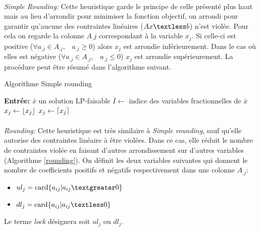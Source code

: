 \documentclass[12pt,a4paper,oneside]{book}
\theoremstyle{definition}
\DeclarePairedDelimiter\ceil{\lceil}{\rceil}
\DeclarePairedDelimiter\floor{\lfloor}{\rfloor}
\begin{document}
	\paragraph{}
	\textit{Simple Rounding:} Cette heuristique garde le principe de celle présenté plus haut mais au lieu d'arrondir pour minimiser la fonction objectif, on arrondi pour garantir qu'aucune des contraintes linéaires ($A x \textless b$) n'est violée. Pour cela on regarde la colonne $A_.j$ correspondant à la variable $x_j$. Si celle-ci est positive ($ \forall a_{.j } \in A_{.j}, \hspace{10pt} a_{.j } \geq 0 $) alors $x_j$ est arrondie inférieurement. Dans le cas où elles est négative ($ \forall a_{.j } \in A_{.j }, \hspace{10pt} a_{.j } \leq 0 $) $x_j$ est arrondie supérieurement. La procédure peut être résumé dans l'algorithme suivant.
	
	\begin{algorithm}
		\caption{Algorithme Simple rounding}
		\SetAlgoLined
		\DontPrintSemicolon
		\textbf{Entrée:} $\bar{x}$ un solution LP-faisable \;
		$\bar{I} \gets $ indice des variables fractionnelles de $\bar{x}$ \;
		{
			{
				$x_j \gets  \floor{x_j}$ \;  
			}
			{
				$x_j \gets  \ceil{x_j}$ \;  
			}
		}
		
	\end{algorithm}

	\paragraph{}
	\textit{Rounding: } Cette heuristique est très similaire à \textit{Simple rounding}, sauf qu'elle autorise des contraintes linéaire à être violées. Dans ce cas, elle réduit le nombre de contraintes violée en faisant d'autres arrondissement sur d'autres variables (Algorithme \ref{rounding}).
	On définit les deux variables suivantes qui donnent le nombre de coefficients positifs et négatifs respectivement dans une colonne $A_{.j}$:
	\begin{itemize}
		\item[] $ ul_j = \text{card}\{a_{ij} | a_{ij} \textgreater 0 \} $ 
		
		\item[] $ dl_j = \text{card}\{a_{ij} | a_{ij} \textless 0 \}$
		
	\end{itemize}
	Le terme \textit{lock} désignera soit $ul_j$ ou $dl_j$.
	
\end{document}
